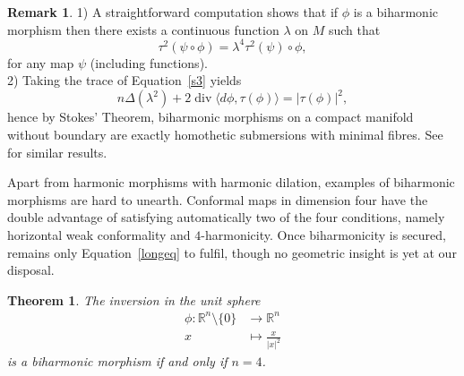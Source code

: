 \documentclass[12pt]{amsart}
\theoremstyle{plain}
\newtheorem{thm}{Theorem}
\theoremstyle{definition}
\newtheorem{rk}{Remark}
\begin{document}
\begin{rk}
1) A straightforward computation shows that if $\phi$ is a biharmonic morphism then
there exists a continuous function $\lambda$ on $M$ such that
\begin{equation*}
\tau^{2} (\psi\circ\phi) = \lambda^{4} \tau^{2}(\psi) \circ \phi ,
\end{equation*}
for any map $\psi$ (including functions).\\
2) Taking the trace of Equation~\eqref{s3} yields
\begin{equation}\label{trace}
n \Delta(\lambda^{2}) + 2 \operatorname{div}{\langle d\phi , \tau(\phi)\rangle} = |\tau(\phi)|^{2} ,
\end{equation}
hence by Stokes' Theorem, biharmonic morphisms on a compact manifold without boundary
 are exactly homothetic submersions with minimal fibres. See~\cite{L-O} for similar results.
\end{rk}

Apart from harmonic morphisms with harmonic dilation, examples of biharmonic
morphisms are hard to unearth. Conformal maps in dimension four have the double
advantage of satisfying automatically two of the four conditions, namely horizontal
weak conformality and $4$-harmonicity. Once biharmonicity is secured, remains only
Equation~\eqref{longeq} to fulfil, though no geometric insight is yet at our
disposal.

\begin{thm}
The inversion in the unit sphere
\begin{align*}
\phi : {{\mathbb R}}^{n}\setminus\{0\} &\to {{\mathbb R}}^n \\
x &\mapsto \frac{x}{|x|^2}
\end{align*}
is a biharmonic morphism if and only if $n=4$.
\end{thm}
\end{document}
